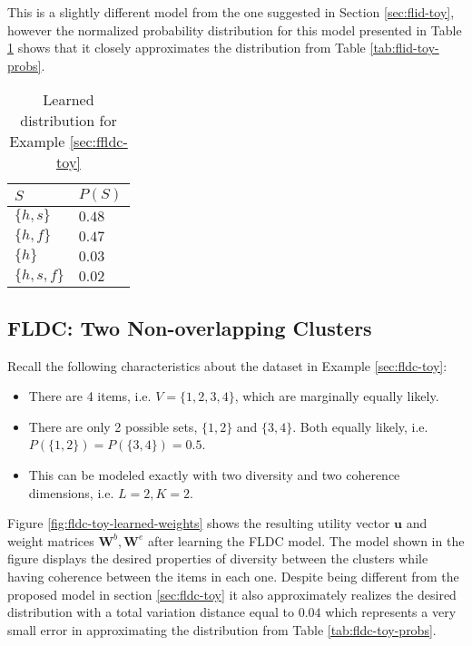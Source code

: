 This is a slightly different model from the one suggested in Section \ref{sec:flid-toy}, however the normalized probability distribution for this model presented in Table \ref{tab:flid-toy-learned-probs} shows that it closely approximates the distribution from Table \ref{tab:flid-toy-probs}.

\begin{table}
  \centering
  \caption{Learned distribution for Example \ref{sec:ffldc-toy}}
  \begin{tabular}{@{}ll@{}}
    \toprule
    $S$ & $P(S)$\\
    \midrule
    $\{h,s\}$ & $0.48$ \\
    $\{h,f\}$ & $0.47$ \\
    $\{h\}$ & $0.03$ \\
    $\{h,s,f\}$ & $0.02$ \\
    \bottomrule
  \end{tabular}
  \label{tab:flid-toy-learned-probs}
\end{table}

\subsection{FLDC: Two Non-overlapping Clusters}

Recall the following characteristics about the dataset in Example \ref{sec:fldc-toy}:

\begin{itemize}
  \item There are 4 items, i.e. $V = \{1,2,3,4\}$, which are marginally equally likely.
  \item There are only 2 possible sets, $\{1,2\}$ and $\{3,4\}$. Both equally likely, i.e. $P(\{1,2\}) = P(\{3,4\}) = 0.5$.
  \item This can be modeled exactly with two diversity and two coherence dimensions, i.e. $L=2,K=2$.
\end{itemize}

Figure \ref{fig:fldc-toy-learned-weights} shows the resulting utility vector $\mathbf{u}$ and weight matrices $\mathbf{W}^{b}, \mathbf{W}^{e}$ after learning the FLDC model. The model shown in the figure displays the desired properties of diversity between the clusters while having coherence between the items in each one. Despite being different from the proposed model in section \ref{sec:fldc-toy} it also approximately realizes the desired distribution with a total variation distance equal to $0.04$ which represents a very small error in approximating the distribution from Table \ref{tab:fldc-toy-probs}.

